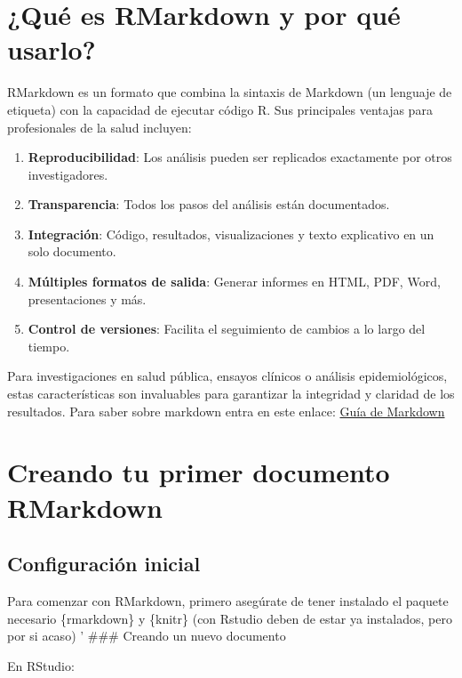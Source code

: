 \documentclass[
  letterpaper,
  DIV=11,
  numbers=noendperiod]{scrreprt}
\providecommand{\tightlist}{%
  \setlength{\itemsep}{0pt}\setlength{\parskip}{0pt}}\usepackage{longtable,booktabs,array}
\begin{document}
\section{¿Qué es RMarkdown y por qué
usarlo?}\label{quuxe9-es-rmarkdown-y-por-quuxe9-usarlo}

RMarkdown es un formato que combina la sintaxis de Markdown (un lenguaje
de etiqueta) con la capacidad de ejecutar código R. Sus principales
ventajas para profesionales de la salud incluyen:

\begin{enumerate}
\def\labelenumi{\arabic{enumi}.}
\tightlist
\item
  \textbf{Reproducibilidad}: Los análisis pueden ser replicados
  exactamente por otros investigadores.
\item
  \textbf{Transparencia}: Todos los pasos del análisis están
  documentados.
\item
  \textbf{Integración}: Código, resultados, visualizaciones y texto
  explicativo en un solo documento.
\item
  \textbf{Múltiples formatos de salida}: Generar informes en HTML, PDF,
  Word, presentaciones y más.
\item
  \textbf{Control de versiones}: Facilita el seguimiento de cambios a lo
  largo del tiempo.
\end{enumerate}

Para investigaciones en salud pública, ensayos clínicos o análisis
epidemiológicos, estas características son invaluables para garantizar
la integridad y claridad de los resultados. Para saber sobre markdown
entra en este enlace: \href{https://tutorialmarkdown.com/guia}{Guía de
Markdown}

\section{Creando tu primer documento
RMarkdown}\label{creando-tu-primer-documento-rmarkdown}

\subsection{Configuración inicial}\label{configuraciuxf3n-inicial}

Para comenzar con RMarkdown, primero asegúrate de tener instalado el
paquete necesario \{rmarkdown\} y \{knitr\} (con Rstudio deben de estar
ya instalados, pero por si acaso) ' \#\#\# Creando un nuevo documento

En RStudio:
\end{document}
